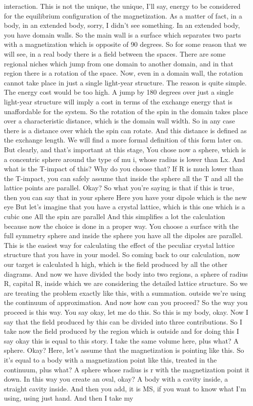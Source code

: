 interaction. This is not the unique, the unique, I'll say, energy to be considered for the equilibrium configuration of the magnetization. As a matter of fact, in a body, in an extended body, sorry, I didn't see something. In an extended body, you have domain walls. So the main wall is a surface which separates two parts with a magnetization which is opposite of 90 degrees. So for some reason that we will see, in a real body there is a field between the spaces. There are some regional niches which jump from one domain to another domain, and in that region there is a rotation of the space. Now, even in a domain wall, the rotation cannot take place in just a single light-year structure. The reason is quite simple. The energy cost would be too high. A jump by 180 degrees over just a single light-year structure will imply a cost in terms of the exchange energy that is unaffordable for the system. So the rotation of the spin in the domain takes place over a characteristic distance, which is the domain wall width. So in any case there is a distance over which the spin can rotate. And this distance is defined as the exchange length. We will find a more formal definition of this form later on. But clearly, and that's important at this stage, You chose now a sphere, which is a concentric sphere around the type of mu i, whose radius is lower than Lx. And what is the T-impact of this? Why do you choose that? If R is much lower than the T-impact, you can safely assume that inside the sphere all the T and all the lattice points are parallel. Okay? So what you're saying is that if this is true, then you can say that in your sphere Here you have your dipole which is the new eye But let's imagine that you have a crystal lattice, which is this one which is a cubic one All the spin are parallel And this simplifies a lot the calculation because now the choice is done in a proper way. You choose a surface with the full symmetry sphere and inside the sphere you have all the dipoles are parallel. This is the easiest way for calculating the effect of the peculiar crystal lattice structure that you have in your model. So coming back to our calculation, now our target is calculated h high, which is the field produced by all the other diagrams. And now we have divided the body into two regions, a sphere of radius R, capital R, inside which we are considering the detailed lattice structure. So we are treating the problem exactly like this, with a summation. outside we're using the continuum of approximation. And now how can you proceed? So the way you proceed is this way. You say okay, let me do this. So this is my body, okay. Now I say that the field produced by this can be divided into three contributions. So I take now the field produced by the region which is outside and for doing this I say okay this is equal to this story. I take the same volume here, plus what? A sphere. Okay? Here, let's assume that the magnetization is pointing like this. So it's equal to a body with a magnetization point like this, treated in the continuum, plus what? A sphere whose radius is r with the magnetization point it down. In this way you create an oval, okay? A body with a cavity inside, a straight cavity inside. And then you add, it is MS, if you want to know what I'm using, using just hand. And then I take my 